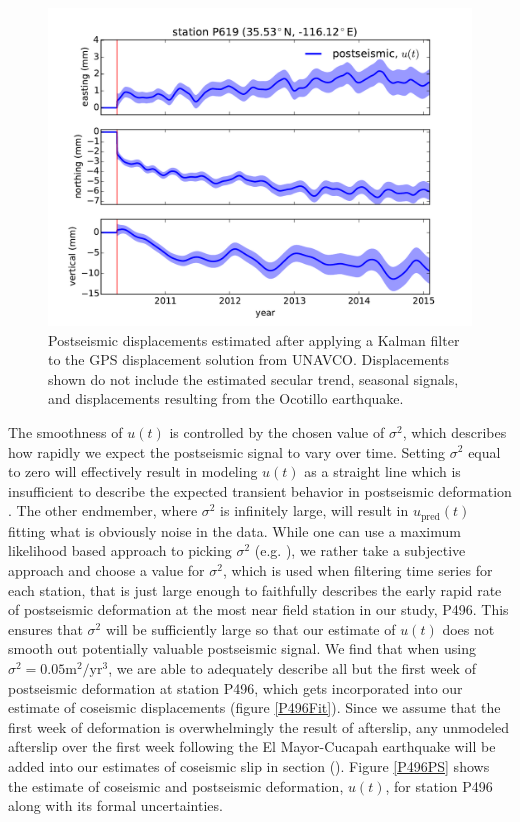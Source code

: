 \documentclass[12pt]{article}
\begin{document}
\begin{figure}

\includegraphics[scale=0.6]{Figures/figure_4}
\centering
\caption{Postseismic displacements estimated after applying a Kalman filter to the GPS displacement solution from UNAVCO.  Displacements shown do not include the estimated secular trend, seasonal signals, and displacements resulting from the Ocotillo earthquake.} 
\label{P619PS}
\end{figure}

The smoothness of $u(t)$ is controlled by the chosen value of $\sigma^2$, which describes how rapidly we expect the postseismic signal to vary over time.  Setting $\sigma^2$ equal to zero will effectively result in modeling $u(t)$ as a straight line which is insufficient to describe the expected transient behavior in postseismic deformation \cite{Savage2005a}. The other endmember, where $\sigma^2$ is infinitely large, will result in $u_\mathrm{pred}(t)$ fitting what is obviously noise in the data. While one can use a maximum likelihood based approach to picking $\sigma^2$ (e.g. \cite{Segall1997}), we rather take a subjective approach and choose a value for $\sigma^2$, which is used when filtering time series for each station, that is just large enough to faithfully describes the early rapid rate of postseismic deformation at the most near field station in our study, P496.  This ensures that $\sigma^2$ will be sufficiently large so that our estimate of $u(t)$ does not smooth out potentially valuable postseismic signal. We find that when using $\sigma^2 = 0.05 \mathrm{m}^2 / \mathrm{yr}^3$, we are able to adequately describe all but the first week of postseismic deformation at station P496, which gets incorporated into our estimate of coseismic displacements (figure \ref{P496Fit}).  Since we assume that the first week of deformation is overwhelmingly the result of afterslip, any unmodeled afterslip over the first week following the El Mayor-Cucapah earthquake will be added into our estimates of coseismic slip in section ().  Figure \ref{P496PS} shows the estimate of coseismic and postseismic deformation, $u(t)$, for station P496 along with its formal uncertainties. 
\end{document}
